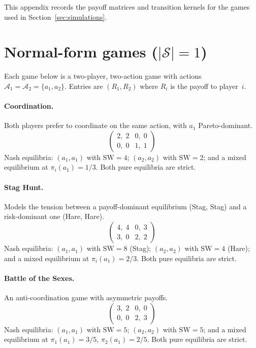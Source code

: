 \documentclass[a4paper,oneside,11pt]{report}
\newcommand{\calS}{\mathcal{S}}
\newcommand{\calA}{\mathcal{A}}
\numberwithin{theorem}{chapter}
\numberwithin{equation}{chapter}
\begin{document}
This appendix records the payoff matrices and transition kernels for
the games used in Section~\ref{sec:simulations}.

\section*{Normal-form games ($|\calS| = 1$)}

Each game below is a two-player, two-action game with actions
$\calA_1 = \calA_2 = \{a_1, a_2\}$. Entries are $(R_1, R_2)$
where $R_i$ is the payoff to player~$i$.

\paragraph{Coordination.}
Both players prefer to coordinate on the same action, with
$a_1$ Pareto-dominant.
\[
\begin{pmatrix} 2,\;2 & 0,\;0 \\ 0,\;0 & 1,\;1 \end{pmatrix}
\]
Nash equilibria: $(a_1, a_1)$ with $\mathrm{SW} = 4$;
$(a_2, a_2)$ with $\mathrm{SW} = 2$; and a mixed equilibrium at
$\pi_i(a_1) = 1/3$. Both pure equilibria are strict.

\paragraph{Stag Hunt.}
Models the tension between a payoff-dominant equilibrium
(Stag, Stag) and a risk-dominant one (Hare, Hare).
\[
\begin{pmatrix} 4,\;4 & 0,\;3 \\ 3,\;0 & 2,\;2 \end{pmatrix}
\]
Nash equilibria: $(a_1, a_1)$ with $\mathrm{SW} = 8$ (Stag);
$(a_2, a_2)$ with $\mathrm{SW} = 4$ (Hare); and a mixed equilibrium
at $\pi_i(a_1) = 2/3$. Both pure equilibria are strict.

\paragraph{Battle of the Sexes.}
An anti-coordination game with asymmetric payoffs.
\[
\begin{pmatrix} 3,\;2 & 0,\;0 \\ 0,\;0 & 2,\;3 \end{pmatrix}
\]
Nash equilibria: $(a_1, a_1)$ with $\mathrm{SW} = 5$;
$(a_2, a_2)$ with $\mathrm{SW} = 5$; and a mixed equilibrium at
$\pi_1(a_1) = 3/5$, $\pi_2(a_1) = 2/5$. Both pure equilibria
are strict.
\end{document}
